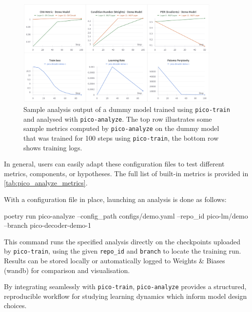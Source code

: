 \begin{figure}[t]
    \centering
    \includegraphics[width=0.9\textwidth]{chapters/pico/figures/demo_full_run.png}
    \caption{Sample analysis output of a dummy model trained using \texttt{pico-train} and analysed with \texttt{pico-analyze}. The top row illustrates some sample metrics computed by \texttt{pico-analyze} on the dummy model that was trained for 100 steps using \texttt{pico-train}, the bottom row shows training logs.}
    \label{fig:demo_full_run}
\end{figure}

In general, users can easily adapt these configuration files to test different metrics, components, or hypotheses. The full list of built-in metrics is provided in \cref{tab:pico_analyze_metrics}.

With a configuration file in place, launching an analysis is done as follows:

\begin{center}
    \begin{codelisting}
    poetry run pico-analyze
        --config_path configs/demo.yaml
        --repo_id pico-lm/demo
        --branch pico-decoder-demo-1
    \end{codelisting}
\end{center}

This command runs the specified analysis directly on the checkpoints uploaded by \texttt{pico-train}, using the given \verb|repo_id| and \verb|branch| to locate the training run. Results can be stored locally or automatically logged to Weights \& Biases (wandb) \citep{wandb} for comparison and visualisation.

By integrating seamlessly with \texttt{pico-train}, \texttt{pico-analyze} provides a structured, reproducible workflow for studying learning dynamics which inform model design choices.

